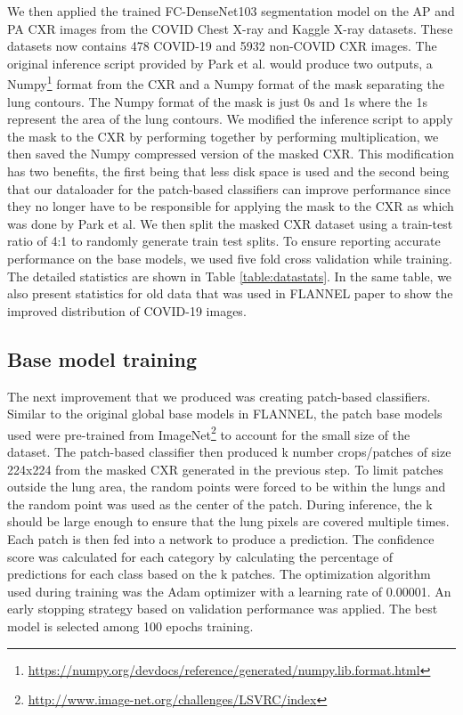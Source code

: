 \documentclass{sigkddExp}
\begin{document}
We then applied the trained FC-DenseNet103 segmentation model on the AP and PA
CXR images from the COVID Chest X-ray and Kaggle X-ray datasets. These datasets now
contains 478 COVID-19 and 5932 non-COVID CXR images. The original
inference script provided by Park et al. would produce two outputs, a Numpy\footnote{
    \url{https://numpy.org/devdocs/reference/generated/numpy.lib.format.html}} format
from the CXR and a Numpy format of the mask separating the lung
contours. The Numpy format of the mask is just 0s and 1s where the 1s
represent the area of the lung contours.  We modified the inference script to
apply the mask to the CXR by performing together by performing multiplication,
we then saved the Numpy compressed version of the masked CXR. This modification
has two benefits, the first being that less disk space is used and the second
being that our dataloader for the patch-based classifiers can improve
performance since they no longer have to be responsible for applying the mask to
the CXR as which was done by Park et al. We then split the masked CXR dataset
using a train-test ratio of 4:1 to randomly generate train test splits. To
ensure reporting accurate performance on the base models, we used five fold
cross validation while training. The detailed statistics are shown in Table
\ref{table:datastats}. In the same table, we also present statistics for old data
that was used in FLANNEL paper \cite{10.1093/jamia/ocaa280} to show the improved
distribution of COVID-19 images.

\subsection{Base model training}
The next improvement that we produced was creating patch-based classifiers.
Similar to the original global base models in FLANNEL, the patch base models
used were pre-trained from
ImageNet\footnote{\url{http://www.image-net.org/challenges/LSVRC/index}} to account
for the small size of the dataset. The patch-based classifier then produced k
number crops/patches of size 224x224 from the masked CXR generated in the
previous step. To limit patches outside the lung area, the random points were
forced to be within the lungs and the random point was used as the center of the
patch. During inference, the k should be large enough to ensure that the lung
pixels are covered multiple times. Each patch is then fed into a network to
produce a prediction. The confidence score was calculated for each category by
calculating the percentage of predictions for each class based on the k patches.
The optimization algorithm used during training was the Adam optimizer with a
learning rate of 0.00001. An early stopping strategy based on validation
performance was applied. The best model is selected among 100 epochs training.
\end{document}
